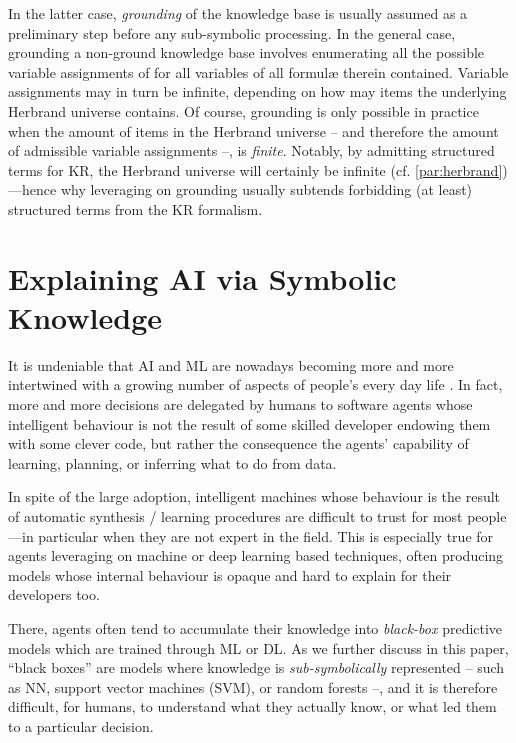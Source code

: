 \documentclass[12pt,a4paper,openright,twoside]{book}
\begin{document}
In the latter case, \emph{grounding} of the knowledge base is usually assumed as a preliminary step before any sub-symbolic processing.
%
In the general case, grounding a non-ground knowledge base involves enumerating all the possible variable assignments of for all variables of all formul\ae{} therein contained.
%
Variable assignments may in turn be infinite, depending on how may items the underlying Herbrand universe contains.
%
Of course, grounding is only possible in practice when the amount of items in the Herbrand universe -- and therefore the amount of admissible variable assignments --, is \emph{finite}.
%
Notably, by admitting structured terms for KR, the Herbrand universe will certainly be infinite (cf. \cref{par:herbrand})---hence why leveraging on grounding usually subtends forbidding (at least) structured terms from the KR formalism.

\chapter{Explaining AI via Symbolic Knowledge}\label{chap:explaining}

It is undeniable that AI and ML are nowadays becoming more and more intertwined with a growing number of aspects of people's every day life \cite{helbing2019, elliott2019}.
%
In fact, more and more decisions are delegated by humans to software agents whose intelligent behaviour is not the result of some skilled developer endowing them with some clever code, but rather the consequence the agents' capability of learning, planning, or inferring what to do from data.

In spite of the large adoption, intelligent machines whose behaviour is the result of automatic synthesis / learning procedures are difficult to trust for most people---in particular when they are not expert in the field.
%
This is especially true for agents leveraging on machine or deep learning based techniques, often producing models whose internal behaviour is opaque and hard to explain for their developers too.

There, agents often tend to accumulate their knowledge into \emph{black-box} predictive models which are trained through ML or DL.
%
As we further discuss in this paper, ``black boxes'' are models where knowledge is \emph{sub-symbolically} represented -- such as NN, support vector machines (SVM), or random forests --, and it is therefore difficult, for humans, to understand what they actually know, or what led them to a particular decision.
\end{document}
